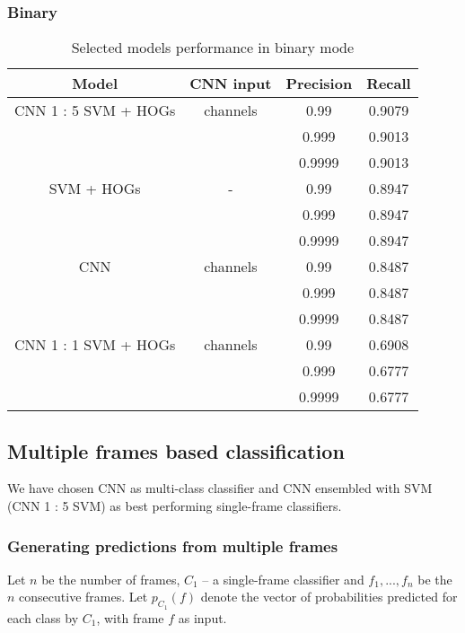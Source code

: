         \subsubsection{Binary}
        \begin{table}[H]
        \begin{center}
        \small
        \caption{Selected models performance in binary mode}
        \begin{tabular}{ |c|c|c|c| }
            \hline
            Model & CNN input & Precision & Recall\\
        \hline
        CNN 1 : 5 SVM + HOGs & channels & 0.99 & 0.9079\\
        & & 0.999 & 0.9013\\
        & & 0.9999 & 0.9013\\
        \hline
        SVM + HOGs & - & 0.99 & 0.8947 \\
        & & 0.999 & 0.8947\\
        & & 0.9999 & 0.8947\\
        \hline
        CNN & channels & 0.99 & 0.8487 \\
        & & 0.999 & 0.8487\\
        & & 0.9999 & 0.8487\\
        \hline
        CNN 1 : 1 SVM + HOGs & channels & 0.99 & 0.6908\\
        & & 0.999 & 0.6777\\
        & & 0.9999 & 0.6777\\
        \hline

        \end{tabular}
        \end{center}
        \end{table}

    \subsection{Multiple frames based classification}
    We have chosen CNN as multi-class classifier and CNN ensembled with SVM (CNN 1 : 5 SVM) as
    best performing single-frame classifiers.

    \subsubsection{Generating predictions from multiple frames}
    Let $n$ be the number of frames, $C_{1}$ -- a single-frame classifier and
    $f_1, ..., f_n$ be the $n$ consecutive frames.
    Let $p_{C_{1}}(f)$ denote the vector of probabilities predicted for each class by $C_{1}$,
    with frame $f$ as input.

